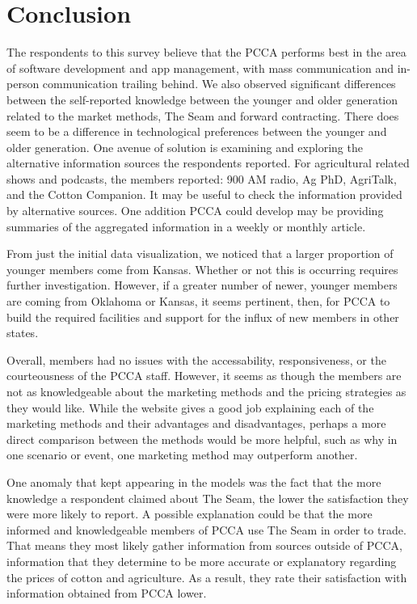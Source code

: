 \documentclass[a4paper]{article}
\begin{document}
\section{Conclusion}

The respondents to this survey believe that the PCCA performs best in the area of software development and app management, with mass communication and in-person communication trailing behind. We also observed significant differences between the self-reported knowledge between the younger and older generation related to the market methods, The Seam and forward contracting. There does seem to be a difference in technological preferences between the younger and older generation. One avenue of solution is examining and exploring the alternative information sources the respondents reported. For agricultural related shows and podcasts, the members reported: 900 AM radio, Ag PhD, AgriTalk, and the Cotton Companion. It may be useful to check the information provided by alternative sources. One addition PCCA could develop may be providing summaries of the aggregated information in a weekly or monthly article. 

From just the initial data visualization, we noticed that a larger proportion of younger members come from Kansas. Whether or not this is occurring requires further investigation. However, if a greater number of newer, younger members are coming from Oklahoma or Kansas, it seems pertinent, then, for PCCA to build the required facilities and support for the influx of new members in other states.  

Overall, members had no issues with the accessability, responsiveness, or the courteousness of the PCCA staff. However, it seems as though the members are not as knowledgeable about the marketing methods and the pricing strategies as they would like. While the website gives a good job explaining each of the marketing methods and their advantages and disadvantages, perhaps a more direct comparison between the methods would be more helpful, such as why in one scenario or event, one marketing method may outperform another. 

One anomaly that kept appearing in the models was the fact that the more knowledge a respondent claimed about The Seam, the lower the satisfaction they were more likely to report. A possible explanation could be that the more informed and knowledgeable members of PCCA use The Seam in order to trade. That means they most likely gather information from sources outside of PCCA, information that they determine to be more accurate or explanatory regarding the prices of cotton and agriculture. As a result, they rate their satisfaction with information obtained from PCCA lower.  
\end{document}
